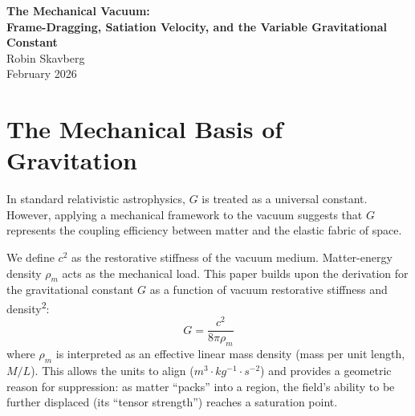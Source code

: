 \documentclass[12pt,a4paper]{article}
\begin{document}
\begin{center}
    \large \textbf{The Mechanical Vacuum: \\ Frame-Dragging, Satiation Velocity, and the Variable Gravitational Constant} \\
    \vspace{1em}
    \normalsize Robin Skavberg \\
    \normalsize February 2026
\end{center}

\begin{abstract}
In standard General Relativity (GR), $G$ is a coupling constant that determines how much spacetime curves for a given amount of energy-momentum. GR treats $G$ as a static scalar, whereas this model treats it as a dynamic equilibrium state of the field itself. We suggest an \textbf{Equilibrium Perspective}: the constant $G$ is the restorative response of the vacuum field. As the matter-energy density ($T_{\mu\nu}$) increases, the vacuum impedance rises, effectively damping the field's ability to respond. This paper derives $G$ as a function of vacuum restorative stiffness and matter-energy density, providing a mechanical solution for flat galactic rotation curves and the observed Newtonian limit in high-density solar systems.
\end{abstract}

\section{The Mechanical Basis of Gravitation}
In standard relativistic astrophysics, $G$ is treated as a universal constant. However, applying a mechanical framework to the vacuum suggests that $G$ represents the coupling efficiency between matter and the elastic fabric of space. 

We define $c^2$ as the restorative stiffness of the vacuum medium. Matter-energy density $\rho_m$ acts as the mechanical load. This paper builds upon the derivation for the gravitational constant $G$ as a function of vacuum restorative stiffness and density\textsuperscript{2}:
\begin{equation}
G = \frac{c^2}{8\pi\rho_m}
\end{equation}
where $\rho_m$ is interpreted as an effective linear mass density (mass per unit length, $M/L$). This allows the units to align ($m^3 \cdot kg^{-1} \cdot s^{-2}$) and provides a geometric reason for suppression: as matter ``packs'' into a region, the field’s ability to be further displaced (its ``tensor strength'') reaches a saturation point.
\end{document}

